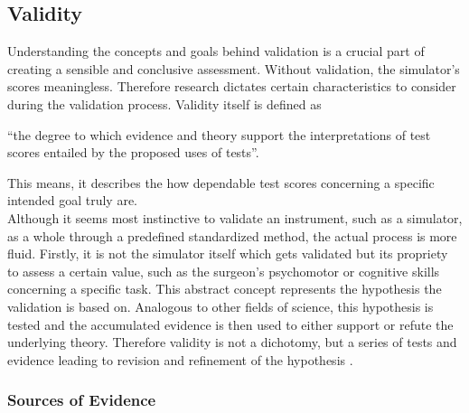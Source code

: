 \subsection{Validity}

Understanding the concepts and goals behind validation is a crucial part of creating a sensible and conclusive assessment. Without validation, the simulator’s scores meaningless. Therefore research dictates certain characteristics to consider during the validation process. Validity itself is defined as 
\begin{center}
 “the degree to which evidence and theory support the interpretations of test scores entailed by the proposed uses of tests”\parencite{ratanawongsa_reported_2008}.
 \end{center} 
This means, it describes the how dependable test scores concerning a specific intended goal truly are. \\
Although it seems most instinctive to validate an instrument, such as a simulator, as a whole through a predefined standardized method, the actual process is more fluid. 
Firstly, it is not the simulator itself which gets validated but its propriety to assess a certain value, such as the surgeon’s psychomotor or cognitive skills concerning a specific task. This abstract concept represents the hypothesis the validation is based on. 
Analogous to other fields of science, this hypothesis is tested and the accumulated evidence is  then used to either support or refute the underlying theory. Therefore validity is not a dichotomy, but a series of tests and evidence leading to revision and refinement of the hypothesis \parencite{cook_current_2006} \parencite{downing_validity:_2003}. 

\subsubsection{Sources of Evidence}

